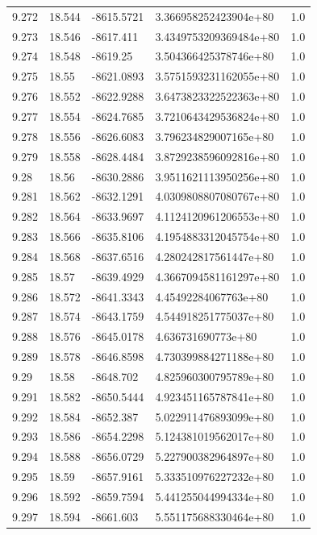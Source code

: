 \begin{tabular}{lllll}
9.272 & 18.544 & -8615.5721 & 3.366958252423904e+80 & 1.0 \\
9.273 & 18.546 & -8617.411 & 3.4349753209369484e+80 & 1.0 \\
9.274 & 18.548 & -8619.25 & 3.504366425378746e+80 & 1.0 \\
9.275 & 18.55 & -8621.0893 & 3.5751593231162055e+80 & 1.0 \\
9.276 & 18.552 & -8622.9288 & 3.6473823322522363e+80 & 1.0 \\
9.277 & 18.554 & -8624.7685 & 3.7210643429536824e+80 & 1.0 \\
9.278 & 18.556 & -8626.6083 & 3.796234829007165e+80 & 1.0 \\
9.279 & 18.558 & -8628.4484 & 3.8729238596092816e+80 & 1.0 \\
9.28 & 18.56 & -8630.2886 & 3.9511621113950256e+80 & 1.0 \\
9.281 & 18.562 & -8632.1291 & 4.0309808807080767e+80 & 1.0 \\
9.282 & 18.564 & -8633.9697 & 4.1124120961206553e+80 & 1.0 \\
9.283 & 18.566 & -8635.8106 & 4.1954883312045754e+80 & 1.0 \\
9.284 & 18.568 & -8637.6516 & 4.280242817561447e+80 & 1.0 \\
9.285 & 18.57 & -8639.4929 & 4.3667094581161297e+80 & 1.0 \\
9.286 & 18.572 & -8641.3343 & 4.45492284067763e+80 & 1.0 \\
9.287 & 18.574 & -8643.1759 & 4.544918251775037e+80 & 1.0 \\
9.288 & 18.576 & -8645.0178 & 4.636731690773e+80 & 1.0 \\
9.289 & 18.578 & -8646.8598 & 4.730399884271188e+80 & 1.0 \\
9.29 & 18.58 & -8648.702 & 4.825960300795789e+80 & 1.0 \\
9.291 & 18.582 & -8650.5444 & 4.923451165787841e+80 & 1.0 \\
9.292 & 18.584 & -8652.387 & 5.022911476893099e+80 & 1.0 \\
9.293 & 18.586 & -8654.2298 & 5.124381019562017e+80 & 1.0 \\
9.294 & 18.588 & -8656.0729 & 5.227900382964897e+80 & 1.0 \\
9.295 & 18.59 & -8657.9161 & 5.333510976227232e+80 & 1.0 \\
9.296 & 18.592 & -8659.7594 & 5.441255044994334e+80 & 1.0 \\
9.297 & 18.594 & -8661.603 & 5.551175688330464e+80 & 1.0 \\

\end{tabular}
